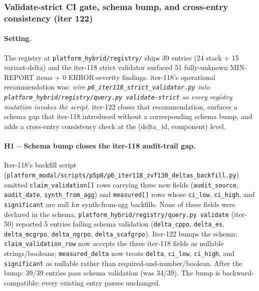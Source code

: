 \documentclass{article}
\begin{document}
\subsubsection{Validate-strict CI gate, schema bump, and cross-entry consistency (iter 122)}
\label{sec:p6-iter122-validate-strict}

\paragraph{Setting.}
The registry at \texttt{platform_hybrid/registry/} ships 39 entries (24 stack + 15
variant-delta) and the iter-118 strict validator surfaced 51 fully-unknown
MIN-REPORT items + 0 ERROR-severity findings. iter-118's operational
recommendation was: \emph{wire \texttt{p6\_iter118\_strict\_validator.py}
into \texttt{platform_hybrid/registry/query.py validate-strict} so every registry mutation
invokes the script.} iter-122 closes that recommendation, surfaces a
schema gap that iter-118 introduced without a corresponding schema bump,
and adds a cross-entry consistency check at the (delta\_id, component)
level.

\paragraph{H1 -- Schema bump closes the iter-118 audit-trail gap.}
Iter-118's backfill script
(\texttt{platform_modal/scripts/p5p8/p6\_iter118\_zvf130\_deltas\_backfill.py}) emitted
\texttt{claim\_validation[]} rows carrying three new fields
(\texttt{audit\_source}, \texttt{audit\_date}, \texttt{synth\_from\_agg})
and \texttt{measured[]} rows whose \texttt{ci\_low}, \texttt{ci\_high},
and \texttt{significant} are null for synth-from-agg backfills. None of
these fields were declared in the schema. \texttt{platform_hybrid/registry/query.py
validate} (iter-50) reported 5 entries failing schema validation
(\texttt{delta\_cppo}, \texttt{delta\_es}, \texttt{delta\_mcgrpo},
\texttt{delta\_ngrpo}, \texttt{delta\_scafgrpo}). Iter-122 bumps the
schema: \texttt{claim\_validation\_row} now accepts the three iter-118
fields as nullable strings/booleans; \texttt{measured\_delta} now treats
\texttt{delta}, \texttt{ci\_low}, \texttt{ci\_high}, and
\texttt{significant} as nullable rather than required-and-number/boolean.
After the bump: 39/39 entries pass schema validation (was 34/39). The
bump is backward-compatible: every existing entry parses unchanged.
\end{document}
